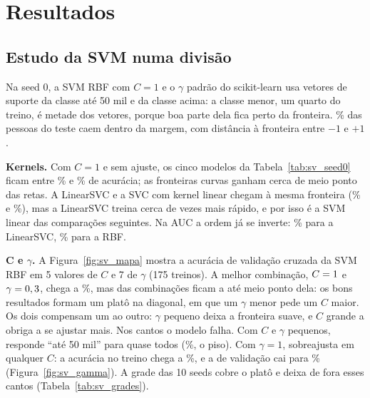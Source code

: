 \section{Resultados}\label{sec:sv_resultados}

\subsection{Estudo da SVM numa divisão}\label{sec:sv_estudo}

Na seed 0, a SVM RBF com $C = 1$ e o $\gamma$ padrão do scikit-learn usa \svVetNeg{} vetores de suporte da classe até 50 mil e \svVetPos{} da classe acima: a classe menor, um quarto do treino, é metade dos vetores, porque boa parte dela fica perto da fronteira. \svMargem\% das pessoas do teste caem dentro da margem, com distância à fronteira entre $-1$ e $+1$.

\textbf{Kernels.} Com $C = 1$ e sem ajuste, os cinco modelos da Tabela~\ref{tab:sv_seed0} ficam entre \svKSVCLin\% e \svKPoliTres\% de acurácia; as fronteiras curvas ganham cerca de meio ponto das retas. A LinearSVC e a SVC com kernel linear chegam à mesma fronteira (\svKLinSVC\% e \svKSVCLin\%), mas a LinearSVC treina cerca de \svRazaoLinear{} vezes mais rápido, e por isso é a SVM linear das comparações seguintes. Na AUC a ordem já se inverte: \svKAucLinSVC\% para a LinearSVC, \svKAucRBF\% para a RBF.

\begin{table}[ht]
\centering
\caption{Seed 0: os kernels com $C = 1$ e o efeito da padronização (\svTreino{} pessoas no treino, \svTeste{} no teste).}
\label{tab:sv_seed0}
\footnotesize

\end{table}

\textbf{C e $\gamma$.} A Figura~\ref{fig:sv_mapa} mostra a acurácia de validação cruzada da SVM RBF em 5 valores de $C$ e 7 de $\gamma$ (175 treinos). A melhor combinação, $C = 1$ e $\gamma = 0,3$, chega a \svMapaMelhor\%, mas \svMapaPerto{} das \svMapaComb{} combinações ficam a até meio ponto dela: os bons resultados formam um platô na diagonal, em que um $\gamma$ menor pede um $C$ maior. Os dois compensam um ao outro: $\gamma$ pequeno deixa a fronteira suave, e $C$ grande a obriga a se ajustar mais. Nos cantos o modelo falha. Com $C$ e $\gamma$ pequenos, responde ``até 50 mil'' para quase todos (\svMapaCanto\%, o piso). Com $\gamma = 1$, sobreajusta em qualquer $C$: a acurácia no treino chega a \svGammaUmTreino\%, e a de validação cai para \svGammaUmVal\% (Figura~\ref{fig:sv_gamma}). A grade das 10 seeds cobre o platô e deixa de fora esses cantos (Tabela~\ref{tab:sv_grades}).

